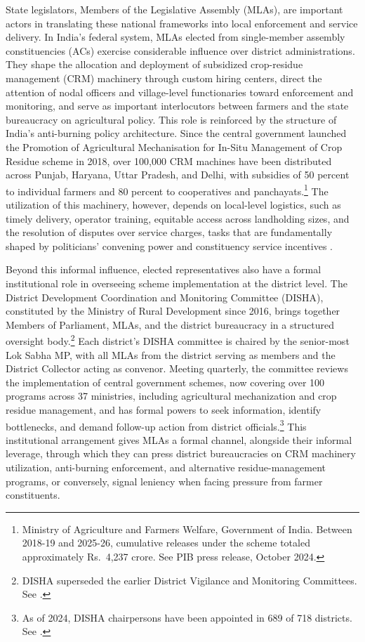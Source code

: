 \documentclass[12pt]{article}
\begin{document}
State legislators, Members of the Legislative Assembly (MLAs), are important actors in translating these national frameworks into local enforcement and service delivery. In India's federal system, MLAs elected from single-member assembly constituencies (ACs) exercise considerable influence over district administrations. They shape the allocation and deployment of subsidized crop-residue management (CRM) machinery through custom hiring centers, direct the attention of nodal officers and village-level functionaries toward enforcement and monitoring, and serve as important interlocutors between farmers and the state bureaucracy on agricultural policy. This role is reinforced by the structure of India's anti-burning policy architecture. Since the central government launched the Promotion of Agricultural Mechanisation for In-Situ Management of Crop Residue scheme in 2018, over 100,000 CRM machines have been distributed across Punjab, Haryana, Uttar Pradesh, and Delhi, with subsidies of 50 percent to individual farmers and 80 percent to cooperatives and panchayats.\footnote{Ministry of Agriculture and Farmers Welfare, Government of India. Between 2018-19 and 2025-26, cumulative releases under the scheme totaled approximately Rs.~4,237 crore. See \citealp{pib_crm_2024}{PIB press release, October 2024}.} The utilization of this machinery, however, depends on local-level logistics, such as timely delivery, operator training, equitable access across landholding sizes, and the resolution of disputes over service charges, tasks that are fundamentally shaped by politicians' convening power and constituency service incentives \citep{jack2022money, shyamsundar2019fields}.

Beyond this informal influence, elected representatives also have a formal institutional role in overseeing scheme implementation at the district level. The District Development Coordination and Monitoring Committee (DISHA), constituted by the Ministry of Rural Development since 2016, brings together Members of Parliament, MLAs, and the district bureaucracy in a structured oversight body.\footnote{DISHA superseded the earlier District Vigilance and Monitoring Committees. See \citealp{disha_mord}.} Each district's DISHA committee is chaired by the senior-most Lok Sabha MP, with all MLAs from the district serving as members and the District Collector acting as convenor. Meeting quarterly, the committee reviews the implementation of central government schemes, now covering over 100 programs across 37 ministries, including agricultural mechanization and crop residue management, and has formal powers to seek information, identify bottlenecks, and demand follow-up action from district officials.\footnote{As of 2024, DISHA chairpersons have been appointed in 689 of 718 districts. See \citealp{pib_disha_2018}.} This institutional arrangement gives MLAs a formal channel, alongside their informal leverage, through which they can press district bureaucracies on CRM machinery utilization, anti-burning enforcement, and alternative residue-management programs, or conversely, signal leniency when facing pressure from farmer constituents.
\end{document}

